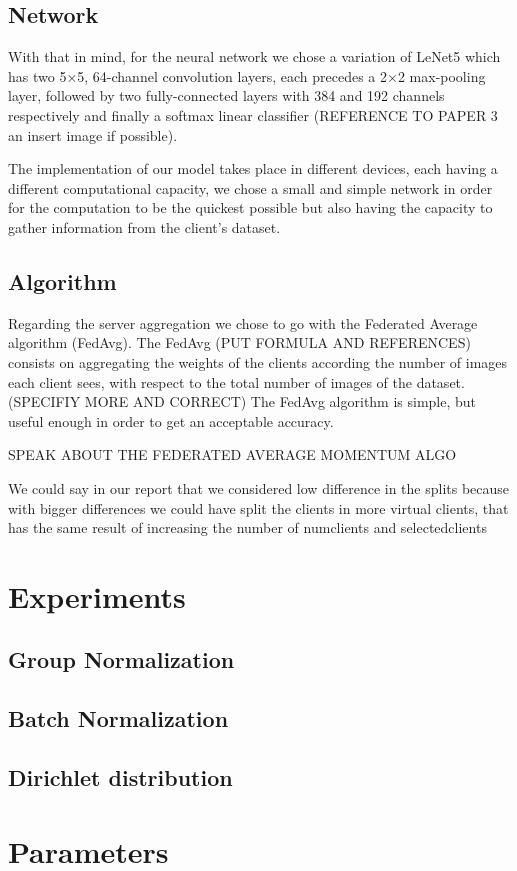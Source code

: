 \documentclass[twocolumn]{article}
\begin{document}
\subsection{Network}

With that in mind, for the neural network we chose a variation of LeNet5 which has two 5×5, 64-channel convolution layers, each precedes a 2×2 max-pooling layer, followed by two fully-connected layers with 384 and 192 channels respectively and finally a softmax linear classifier (REFERENCE TO PAPER 3 an insert image if possible). 

The implementation of our model takes place in different devices, each having a different computational capacity, we chose a small and simple network in order for the computation to be the quickest possible but also having the capacity to gather information from the client's dataset.

\subsection{Algorithm}
Regarding the server aggregation we chose to go with the Federated Average algorithm (FedAvg). The FedAvg (PUT FORMULA AND REFERENCES) consists on aggregating the weights of the clients according the number of images each client sees, with respect to the total number of images of the dataset.(SPECIFIY MORE AND CORRECT)
The FedAvg algorithm is simple, but useful enough in order to get an acceptable accuracy.

SPEAK ABOUT THE FEDERATED AVERAGE MOMENTUM ALGO

We could say in our report that we considered low difference in the splits because with bigger differences we could have split  the clients in more virtual clients, that has the same result of increasing the number of numclients and selectedclients

\section{Experiments} %
\subsection{Group Normalization}
\subsection{Batch Normalization}
\subsection{Dirichlet distribution}
\section{Parameters}
\end{document}
